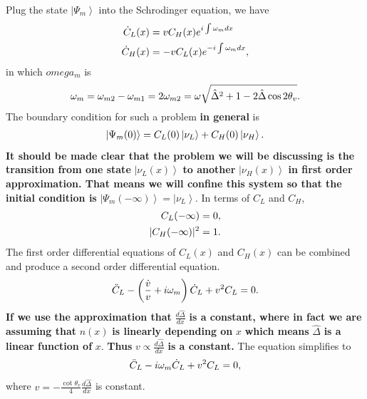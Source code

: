 \documentclass[letterpaper,12pt,english]{sphinxmanual}
\newcommand{\ket}[1]{\left| #1\right\rangle}
\begin{document}
Plug the state \(\ket{\Psi_m}\) into the Schrodinger equation, we have
\begin{gather}
\begin{split}\dot C_L(x) &= v C_H(x) e^{  i\int  \omega_m dx} \\
\dot C_H(x) & = -v C_L(x) e^{ - i\int \omega_m dx} ,\end{split}\notag
\end{gather}
in which \(omega_m\) is
\begin{gather}
\begin{split}\omega_m =  \omega_{m2} - \omega_{m1} = 2\omega_{m2} = \omega\sqrt{ \hat\Delta^2 + 1 - 2 \hat\Delta \cos 2\theta_v } .\end{split}\notag
\end{gather}
The boundary condition for such a problem \textbf{in general} is
\begin{gather}
\begin{split}\ket{\Psi_m(0)} = C_L(0)\ket{\nu_L} + C_H(0) \ket{\nu_H}.\end{split}\notag
\end{gather}
\textbf{It should be made clear that the problem we will be discussing is the transition from one state} \(\ket{\nu_L(x)}\) \textbf{to another} \(\ket{\nu_H(x)}\) \textbf{in first order approximation. That means we will confine this system so that the initial condition is} \(\ket{\Psi_m(-\infty)} = \ket{\nu_L}\). In terms of \(C_L\) and \(C_H\),
\begin{gather}
\begin{split}C_L(-\infty) &= 0, \\
\lvert C_H(-\infty) \rvert^2 & = 1.\end{split}\notag
\end{gather}
The first order differential equations of \(C_L(x)\) and \(C_H(x)\) can be combined and produce a second order differential equation.
\begin{gather}
\begin{split}\ddot C_L - \left(   \frac{\dot v}{v} + i\omega_m \right) \dot C_L + v^2 C_L = 0.\end{split}\notag
\end{gather}
\textbf{If we use the approximation that} \(\frac{d \hat\Delta }{dx}\) \textbf{is a constant, where in fact we are assuming that} \(n(x)\) \textbf{is linearly depending on} \(x\) \textbf{which means} \(\hat\Delta\) \textbf{is a linear function of} \(x\). \textbf{Thus} \(v\propto\frac{d\hat\Delta}{dx}\) \textbf{is a constant.} The equation simplifies to
\begin{gather}
\begin{split}\ddot C_L - i\omega_m \dot C_L + v^2 C_L = 0,\end{split}\notag
\end{gather}
where \(v=-\frac{\cot\theta_v}{4} \frac{d\hat\Delta}{dx}\) is constant.
\end{document}
